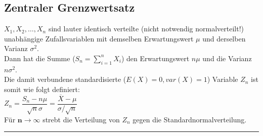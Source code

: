 \newpage

	\subsection{Zentraler Grenzwertsatz  }
      	$X_1, X_2, \ldots , X_n$ sind lauter identisch verteilte (nicht notwendig normalverteilt!)
      	unabhängige Zufallsvariablen mit demselben Erwartungswert $\mu$ und derselben Varianz $\sigma^2$.
      	\\ 
      	Dann hat die Summe ($S_n = \sum_{i=1}^n X_i$) den Erwartungswert $n \mu$ und die Varianz
      	$n \sigma^2$. \\
      	Die damit verbundene standardisierte ($E(X) = 0, var(X) = 1$) Variable $Z_n$ ist somit wie
      	folgt definiert: \\ $ Z_n = \dfrac{S_n - n \mu}{\sqrt{n} \sigma} = \dfrac{\overline{X} - \mu}{\sigma
      	/ \sqrt{n}}$
      	\\
      	Für $\boldsymbol{n \to \infty}$ strebt die Verteilung von $Z_n$ gegen die
      	Standardnormalverteilung. \\
        
\hrule

